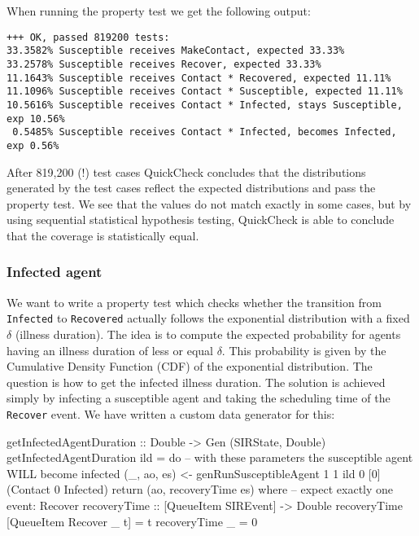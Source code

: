 When running the property test we get the following output:

\begin{footnotesize}
\begin{verbatim}
+++ OK, passed 819200 tests:
33.3582% Susceptible receives MakeContact, expected 33.33%
33.2578% Susceptible receives Recover, expected 33.33%
11.1643% Susceptible receives Contact * Recovered, expected 11.11%
11.1096% Susceptible receives Contact * Susceptible, expected 11.11%
10.5616% Susceptible receives Contact * Infected, stays Susceptible, exp 10.56%
 0.5485% Susceptible receives Contact * Infected, becomes Infected, exp 0.56%
\end{verbatim}
\end{footnotesize}

After 819,200 (!) test cases QuickCheck concludes that the distributions generated by the test cases reflect the expected distributions and pass the property test. We see that the values do not match exactly in some cases, but by using sequential statistical hypothesis testing, QuickCheck is able to conclude that the coverage is statistically equal.

\subsubsection{Infected agent}
We want to write a property test which checks whether the transition from \texttt{Infected} to \texttt{Recovered} actually follows the exponential distribution with a fixed $\delta$ (illness duration). The idea is to compute the expected probability for agents having an illness duration of less or equal $\delta$. This probability is given by the Cumulative Density Function (CDF) of the exponential distribution. The question is how to get the infected illness duration. The solution is achieved simply by infecting a susceptible agent and taking the scheduling time of the \texttt{Recover} event. We have written a custom data generator for this:

\begin{HaskellCode}
getInfectedAgentDuration :: Double -> Gen (SIRState, Double)
getInfectedAgentDuration ild = do
  -- with these parameters the susceptible agent WILL become infected
  (_, ao, es) <- genRunSusceptibleAgent 1 1 ild 0 [0] (Contact 0 Infected)
  return (ao, recoveryTime es)
  where
    -- expect exactly one event: Recover
    recoveryTime :: [QueueItem SIREvent] -> Double
    recoveryTime [QueueItem Recover _ t]  = t
    recoveryTime _ = 0
\end{HaskellCode}

